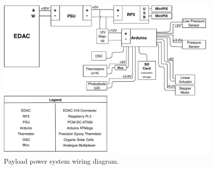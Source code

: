 \newpage
\appendix
\section{}
\label{app:PowerDiagram}
  \begin{figure}[h]
    \includegraphics[width=\textwidth]{Figures/WiringDiagram-PSIP.pdf}
    \caption{Payload power system wiring diagram.}
    \label{fig:wiring-diagram}
  \end{figure}  
